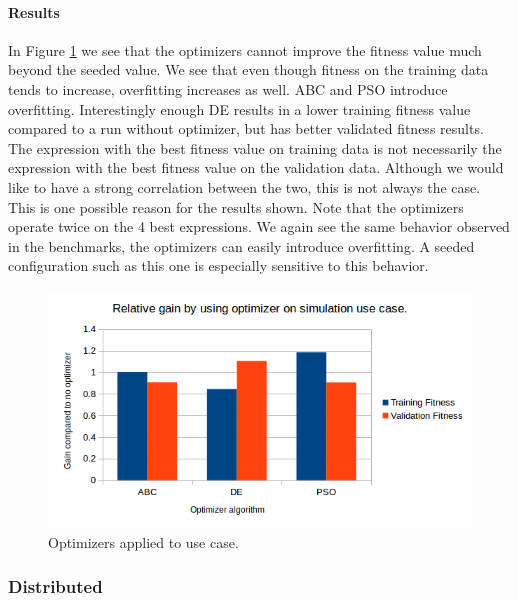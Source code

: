 \paragraph{Results}
In Figure \ref{fig:usecaseoptimizers} we see that the optimizers cannot improve the fitness value much beyond the seeded value. We see that even though fitness on the training data tends to increase, overfitting increases as well. ABC and PSO introduce overfitting. Interestingly enough DE results in a lower training fitness value compared to a run without optimizer, but has better validated fitness results. The expression with the best fitness value on training data is not necessarily the expression with the best fitness value on the validation data. Although we would like to have a strong correlation between the two, this is not always the case. This is one possible reason for the results shown. Note that the optimizers operate twice on the 4 best expressions. We again see the same behavior observed in the benchmarks, the optimizers can easily introduce overfitting. A seeded configuration such as this one is especially sensitive to this behavior.
\begin{figure}
    \centering
    \includegraphics[width=\textwidth,height=\textheight,keepaspectratio]{figures/usecaseoptimizers.png}
    \caption{Optimizers applied to use case.}
    \label{fig:usecaseoptimizers}
\end{figure}

\subsubsection{Distributed}
